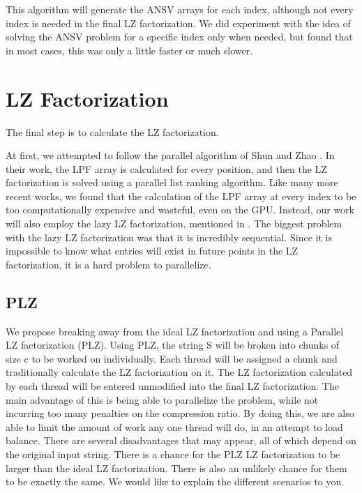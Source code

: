 This algorithm will generate the ANSV arrays for each index, although not every index is needed in the final LZ factorization. 
We did experiment with the idea of solving the ANSV problem for a specific index only when needed, but found that in most cases, this was only a little faster or much slower.

\section{LZ Factorization}

The final step is to calculate the LZ factorization.

At first, we attempted to follow the parallel algorithm of Shun and Zhao \cite{shun2013practical}.
In their work, the LPF array is calculated for every position, and then the LZ factorization is solved using a parallel list ranking algorithm.
Like many more recent works, we found that the calculation of the LPF array at every index to be too computationally expensive and wasteful, even on the GPU.
Instead, our work will also employ the lazy LZ factorization, mentioned in \cite{karkkainen2013linear}.
The biggest problem with the lazy LZ factorization was that it is incredibly sequential.
Since it is impossible to know what entries will exist in future points in the LZ factorization, it is a hard problem to parallelize.

\subsection{PLZ}

We propose breaking away from the ideal LZ factorization and using a Parallel LZ factorization (PLZ).
Using PLZ, the string S will be broken into chunks of size c to be worked on individually.
Each thread will be assigned a chunk and traditionally calculate the LZ factorization on it.
The LZ factorization calculated by each thread will be entered unmodified into the final LZ factorization.
The main advantage of this is being able to parallelize the problem, while not incurring too many penalties on the compression ratio.
By doing this, we are also able to limit the amount of work any one thread will do, in an attempt to load balance.
There are several disadvantages that may appear, all of which depend on the original input string.
There is a chance for the PLZ LZ factorization to be larger than the ideal LZ factorization.
There is also an unlikely chance for them to be exactly the same.
We would like to explain the different scenarios to you.

